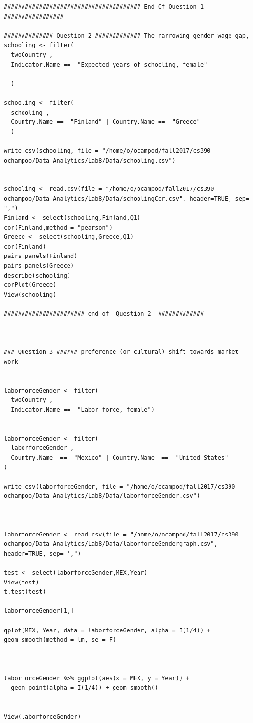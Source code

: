 \documentclass[12pt]{article}
\begin{document}
\begin{lstlisting}
####################################### End Of Question 1 #################

############## Question 2 ############# The narrowing gender wage gap,
schooling <- filter(
  twoCountry ,
  Indicator.Name ==  "Expected years of schooling, female" 
  
  )

schooling <- filter(
  schooling ,
  Country.Name ==  "Finland" | Country.Name ==  "Greece"
  )

write.csv(schooling, file = "/home/o/ocampod/fall2017/cs390-ochampoo/Data-Analytics/Lab8/Data/schooling.csv")


schooling <- read.csv(file = "/home/o/ocampod/fall2017/cs390-ochampoo/Data-Analytics/Lab8/Data/schoolingCor.csv", header=TRUE, sep= ",")
Finland <- select(schooling,Finland,Q1)
cor(Finland,method = "pearson")
Greece <- select(schooling,Greece,Q1)
cor(Finland)
pairs.panels(Finland)
pairs.panels(Greece)
describe(schooling)
corPlot(Greece)
View(schooling)

####################### end of  Question 2  #############



### Question 3 ###### preference (or cultural) shift towards market work


laborforceGender <- filter(
  twoCountry ,
  Indicator.Name ==  "Labor force, female")


laborforceGender <- filter(
  laborforceGender ,  
  Country.Name  ==  "Mexico" | Country.Name  ==  "United States"
)

write.csv(laborforceGender, file = "/home/o/ocampod/fall2017/cs390-ochampoo/Data-Analytics/Lab8/Data/laborforceGender.csv")



laborforceGender <- read.csv(file = "/home/o/ocampod/fall2017/cs390-ochampoo/Data-Analytics/Lab8/Data/laborforceGendergraph.csv", header=TRUE, sep= ",")  

test <- select(laborforceGender,MEX,Year)
View(test)
t.test(test)

laborforceGender[1,]

qplot(MEX, Year, data = laborforceGender, alpha = I(1/4)) + geom_smooth(method = lm, se = F)



laborforceGender %>% ggplot(aes(x = MEX, y = Year)) +
  geom_point(alpha = I(1/4)) + geom_smooth()


View(laborforceGender)



















\end{lstlisting}
\end{document}
